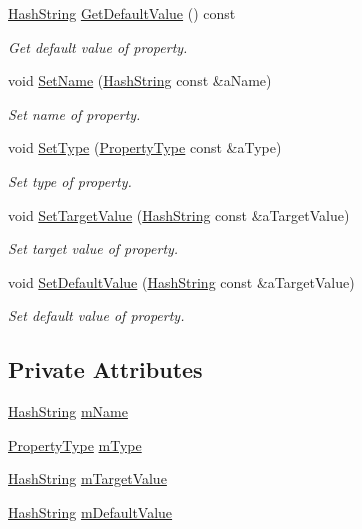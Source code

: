 \begin{DoxyCompactItemize}
\hyperlink{classHashString}{Hash\+String} \hyperlink{classSurfaceProperty_a8ee1ec755b62eabfa9bf88418411cd79}{Get\+Default\+Value} () const 
\begin{DoxyCompactList}\small\item\em Get default value of property. \end{DoxyCompactList}\item 
void \hyperlink{classSurfaceProperty_aedb9cc3be1a148081e03804c6a26940d}{Set\+Name} (\hyperlink{classHashString}{Hash\+String} const \&a\+Name)
\begin{DoxyCompactList}\small\item\em Set name of property. \end{DoxyCompactList}\item 
void \hyperlink{classSurfaceProperty_aa423304267d986d47edd0acc5e18c7fc}{Set\+Type} (\hyperlink{SurfaceProperty_8h_a7ff5a5c54f182b86d1cd993cf4512c87}{Property\+Type} const \&a\+Type)
\begin{DoxyCompactList}\small\item\em Set type of property. \end{DoxyCompactList}\item 
void \hyperlink{classSurfaceProperty_a5fed236f834b13a5ecafb7c7e88018a4}{Set\+Target\+Value} (\hyperlink{classHashString}{Hash\+String} const \&a\+Target\+Value)
\begin{DoxyCompactList}\small\item\em Set target value of property. \end{DoxyCompactList}\item 
void \hyperlink{classSurfaceProperty_a26702fe1414ad9b8c21c38ffa52a40de}{Set\+Default\+Value} (\hyperlink{classHashString}{Hash\+String} const \&a\+Target\+Value)
\begin{DoxyCompactList}\small\item\em Set default value of property. \end{DoxyCompactList}\end{DoxyCompactItemize}
\subsection*{Private Attributes}
\begin{DoxyCompactItemize}
\item 
\hyperlink{classHashString}{Hash\+String} \hyperlink{classSurfaceProperty_a4870f574baaab9a87d727c17c8808f76}{m\+Name}
\item 
\hyperlink{SurfaceProperty_8h_a7ff5a5c54f182b86d1cd993cf4512c87}{Property\+Type} \hyperlink{classSurfaceProperty_a0b8b655662c624a062652739d370213e}{m\+Type}
\item 
\hyperlink{classHashString}{Hash\+String} \hyperlink{classSurfaceProperty_a50fb9a1fd99cfdb17f78e2f55333e443}{m\+Target\+Value}
\item 
\hyperlink{classHashString}{Hash\+String} \hyperlink{classSurfaceProperty_aa95ba56c0c3fc68de72252da61057db4}{m\+Default\+Value}
\end{DoxyCompactItemize}


